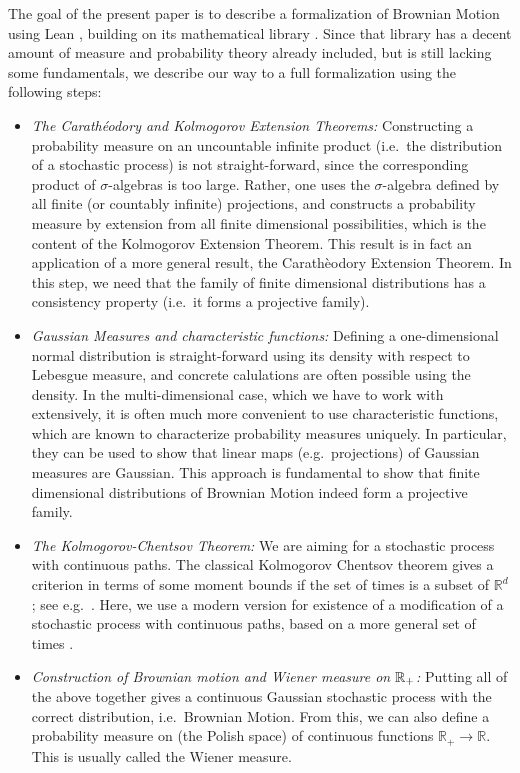 \documentclass[lean]{Draft}
\begin{document}
The goal of the present paper is to describe a formalization of Brownian Motion using Lean \cite{lean, moura2021lean}, building on its mathematical library \mathlib \cite{mathlib}.
Since that library has a decent amount of measure and probability theory already included, but is still lacking some fundamentals, we describe our way to a full formalization using the following steps:
\begin{itemize}
\item {\em The Carathéodory and Kolmogorov Extension Theorems:} Constructing a probability measure on an uncountable infinite product (i.e.\ the distribution of a stochastic process) is not straight-forward, since the corresponding product of $\sigma$-algebras is too large. Rather, one uses the $\sigma$-algebra defined by all finite (or countably infinite) projections, and constructs a probability measure by extension from all finite dimensional possibilities, which is the content of the Kolmogorov Extension Theorem. This result is in fact an application of a more general result, the Carathèodory Extension Theorem. In this step, we need that the family of finite dimensional distributions has a consistency property (i.e.\ it forms a projective family).
\item {\em Gaussian Measures and characteristic functions:} Defining a one-dimensional normal distribution is straight-forward using its density with respect to Lebesgue measure, and concrete calulations are often possible using the density. In the multi-dimensional case, which we have to work with extensively, it is often much more convenient to use characteristic functions, which are known to characterize probability measures uniquely. In particular, they can be used to show that linear maps (e.g.\ projections) of Gaussian measures are Gaussian. This approach is fundamental to show that finite dimensional distributions of Brownian Motion indeed form a projective family.
\item {\em The Kolmogorov-Chentsov Theorem:} We are aiming for a stochastic process with continuous paths. The classical Kolmogorov Chentsov theorem gives a criterion in terms of some moment bounds if the set of times is a subset of $\mathbb R^d$; see e.g.\ \cite{kallenberg2021}. Here, we use a modern version for existence of a modification of a stochastic process with continuous paths, based on a more general set of times \cite{kratschmer2023kolmogorov}.
\item {\em Construction of Brownian motion and Wiener measure on $\mathbb{R}_+$:} Putting all of the above together gives a continuous Gaussian stochastic process with the correct distribution, i.e.\ Brownian Motion. From this, we can also define a probability measure on (the Polish space) of continuous functions $\mathbb R_+ \to \mathbb R$. This is usually called the Wiener measure.
\end{itemize}
\end{document}
